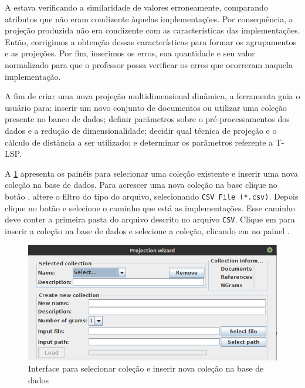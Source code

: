 		A  estava verificando a similaridade de valores erroneamente,
		comparando atributos que não eram condizente àquelas implementações. Por consequência,
		a projeção produzida não era condizente com as características das implementações.
		Então, corrigimos a obtenção dessas características para formar os agrupamentos e
		as projeções. Por fim, inserimos os erros, sua quantidade e seu valor normalizado
		para que o professor possa verificar os erros que ocorreram naquela implementação.
		
		A fim de criar uma nova projeção multidimensional dinâmica, a ferramenta guia o usuário
		para: inserir um novo conjunto de documentos ou utilizar uma coleção presente no banco
		de dados; definir parâmetros sobre o pré-processamentos dos dados e a redução de
		dimensionalidade; decidir qual técnica de projeção e o cálculo de distância a ser utilizado;
		e determinar os parâmetros referente a \acs{T-LSP}.

		A \cref{fig:createDatabase} apresenta os painéis para selecionar uma coleção existente
		e inserir uma nova coleção na base de dados. Para acrescer uma nova coleção na base
		clique no botão , altere o filtro do tipo do arquivo, selecionando
		\texttt{CSV File (*.csv)}. Depois clique no botão  e selecione o
		caminho que está as implementações. Esse caminho deve conter a primeira pasta do
		arquivo descrito no arquivo \texttt{CSV}. Clique em  para inserir a
		coleção na base de dados e selecione a coleção, clicando em  no painel
		.
		
		\begin{figure}
			\centering
			\includegraphics[width=0.8\linewidth]{imagem/createDatabase}
			\caption{Interface para selecionar coleção e inserir nova coleção na base de dados}
			\label{fig:createDatabase}
		\end{figure}
		
